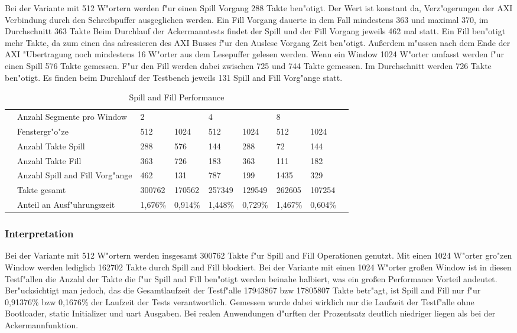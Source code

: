 Bei der Variante mit 512 W"ortern werden f"ur einen Spill Vorgang 288 Takte ben"otigt. Der Wert ist konstant da, Verz"ogerungen der AXI Verbindung durch den Schreibpuffer ausgeglichen werden. Ein Fill Vorgang dauerte in dem Fall mindestens 363 und maximal 370, im Durchschnitt 363 Takte 
Beim Durchlauf der Ackermanntests findet der Spill und der Fill Vorgang jeweils 462 mal statt. 
Ein Fill ben"otigt mehr Takte, da zum einen das adressieren des AXI Busses f"ur den Auslese Vorgang Zeit ben"otigt. Außerdem m"ussen nach dem Ende der AXI "Ubertragung noch mindestens 16 W"orter aus dem Lesepuffer gelesen werden.  
Wenn ein Window 1024 W"orter umfasst werden f"ur einen Spill 576 Takte gemessen. F"ur den Fill werden dabei zwischen 725 und 744 Takte gemessen. Im Durchschnitt werden 726 Takte ben"otigt. 
Es finden beim Durchlauf der Testbench jeweils 131 Spill and Fill Vorg"ange statt. 
\begin{table}[]
	\centering
	\caption{Spill and Fill Performance}
	\label{my-label}
	\begin{tabular}{lllllllll}
		& Anzahl Segmente pro Window  &2 & &4 & &8 & &\\		
		& Fenstergr"o"ze & 512 & 1024 & 512 & 1024 & 512 & 1024&\\
		& Anzahl Takte Spill & 288 & 576 & 144 & 288 & 72 & 144 &\\
		& Anzahl Takte Fill & 363 & 726 & 183 & 363 & 111 & 182 & \\
		& Anzahl Spill and Fill Vorg"ange & 462 & 131 & 787 & 199 & 1435 & 329 & \\
		& Takte gesamt  & 300762 & 170562 & 257349 & 129549 & 262605 & 107254 & \\
		& Anteil an Ausf"uhrungszeit   & 1,676\% & 0,914\% & 1,448\% & 0,729\% & 1,467\% & 0,604\% &\\
		
	\end{tabular}
\end{table}


\subsubsection{Interpretation}
Bei der Variante mit 512 W"ortern werden insgesamt 300762 Takte f"ur Spill and Fill Operationen genutzt. Mit einen 1024 W"orter gro"zen Window werden lediglich 162702 Takte durch Spill and Fill blockiert. Bei der Variante mit einen 1024 W"orter großen Window ist in diesen Testf"allen die Anzahl der Takte die f"ur Spill and Fill ben"otigt werden beinahe halbiert, was ein großen Performance Vorteil andeutet. Ber"ucksichtigt man jedoch, das die Gesamtlaufzeit der Testf"alle 17943867 bzw 17805807 Takte betr"agt, ist Spill and Fill nur f"ur 0,91376\% bzw 0,1676\% der Laufzeit der Tests verantwortlich. Gemessen wurde dabei wirklich nur die Laufzeit der Testf"alle ohne Bootloader, static Initializer und uart Ausgaben. Bei realen Anwendungen d"urften der Prozentsatz deutlich niedriger liegen als bei der Ackermannfunktion. 


